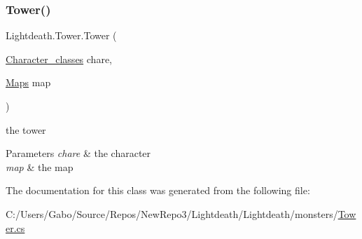 \subsubsection{\texorpdfstring{Tower()}{Tower()}}
{\footnotesize\ttfamily Lightdeath.\+Tower.\+Tower (\begin{DoxyParamCaption}\item[{\hyperlink{class_lightdeath_1_1_character__classes}{Character\+\_\+classes}}]{chare,  }\item[{\hyperlink{class_lightdeath_1_1_maps}{Maps}}]{map }\end{DoxyParamCaption})\hspace{0.3cm}{\ttfamily [inline]}}



the tower 


\begin{DoxyParams}{Parameters}
{\em chare} & the character\\
\hline
{\em map} & the map\\
\hline
\end{DoxyParams}


The documentation for this class was generated from the following file\+:\begin{DoxyCompactItemize}
\item 
C\+:/\+Users/\+Gabo/\+Source/\+Repos/\+New\+Repo3/\+Lightdeath/\+Lightdeath/monsters/\hyperlink{_tower_8cs}{Tower.\+cs}\end{DoxyCompactItemize}
